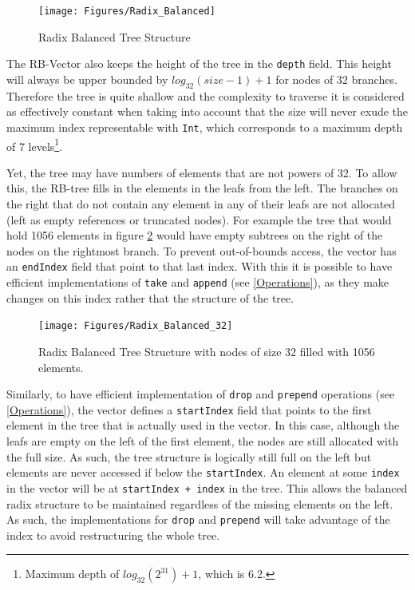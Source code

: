 \begin{figure}[h!]
  \centering
  \texttt{[image: Figures/Radix\_Balanced]}
  \caption{Radix Balanced Tree Structure}
   \label{badix_balanced}
\end{figure}

The RB-Vector also keeps the height of the tree in the \texttt{depth} field. This height will always be upper bounded by $log_{32}(size-1)+1$ for nodes of 32 branches. Therefore the tree is quite shallow and the complexity to traverse it is considered as effectively constant when taking into account that the size will never exude the maximum index representable with \texttt{Int}, which corresponds to a maximum depth of 7 levels\footnote{Maximum depth of $log_{32}(2^{31}) + 1$, which is 6.2.}.

Yet, the tree may have numbers of elements that are not powers of 32. To allow this, the RB-tree fills in the elements in the leafs from the left. The branches on the right that do not contain any element in any of their leafs are not allocated (left as empty references or truncated nodes). For example the tree that would hold 1056 elements in figure \ref{badix_balanced_32} would have empty subtrees on the right of the nodes on the rightmost branch. To prevent out-of-bounds access, the vector has an \texttt{endIndex} field that point to that last index. With this it is possible to have efficient implementations of \texttt{take} and \texttt{append} (see \ref{Operations}), as they make changes on this index rather that the structure of the tree.

\begin{figure}[h!]
  \centering
  \texttt{[image: Figures/Radix\_Balanced\_32]}
  \caption{Radix Balanced Tree Structure with nodes of size 32 filled with 1056 elements.}
   \label{badix_balanced_32}
\end{figure}

Similarly, to have efficient implementation of \texttt{drop} and \texttt{prepend} operations (see \ref{Operations}), the vector defines a \texttt{startIndex} field that points to the first element in the tree that is actually used in the vector. In this case, although the leafs are empty on the left of the first element, the nodes are still allocated with the full size. As such, the tree structure is logically still full on the left but elements are never accessed if below the \texttt{startIndex}. An element at some \texttt{index} in the vector will be at \texttt{startIndex + index} in the tree. This allows the balanced radix structure to be maintained regardless of the missing elements on the left. As such, the implementations for \texttt{drop} and \texttt{prepend} will take advantage of the index to avoid restructuring the whole tree.

